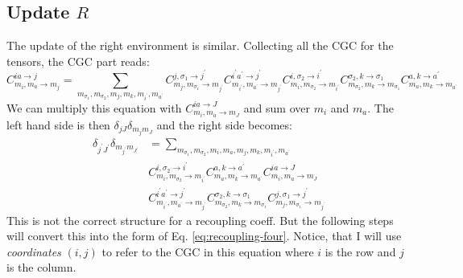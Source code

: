 \documentclass[a4paper,10pt,parskip=full]{scrartcl}
\begin{document}
\subsection{Update $R$}
The update of the right environment is similar.
Collecting all the CGC for the tensors, the CGC part reads:
\begin{equation}
  C^{i a\rightarrow j}_{m_{i},m_{a} \rightarrow m_{j}} =
  \sum_{m_{\sigma_1},m_{\sigma_2},m_j,m_k,m_{i^\prime},m_{a^\prime}}
  C^{ j,\sigma_1\rightarrow j^\prime}_{ m_j,m_{\sigma_1}\rightarrow m_{j^\prime}}
  C^{i^\prime a^\prime\rightarrow j^\prime}_{m_{i^\prime},m_{a^\prime} \rightarrow m_{j^\prime}}
  C^{i,\sigma_2\rightarrow i^\prime}_{m_i,m_{\sigma_2}\rightarrow m_{i^\prime}}
  C^{\sigma_2,k\rightarrow\sigma_1}_{m_{\sigma_2},m_k\rightarrow m_{\sigma_1}}C^{a,k\rightarrow a^\prime}_{m_a,m_k\rightarrow m_{a^\prime}}
\end{equation}
We can multiply this equation with $C^{i a\rightarrow J}_{m_{i},m_{a} \rightarrow m_{J}}$
and sum over $m_{i}$ and $m_{a}$. The left hand side is then $\delta_{jJ}\delta_{m_{j}m_{J}}$
and the right side becomes:
\begin{equation}
  \begin{split}
  \delta_{j^\prime J^\prime}\delta_{m_{j^\prime} m_{J^\prime}} &=
  \sum_{m_{\sigma_1},m_{\sigma_2},m_i,m_a,m_j,m_k,m_{i^\prime},m_{a^\prime}}\\
  &C^{i,\sigma_2\rightarrow i^\prime}_{m_i,m_{\sigma_2}\rightarrow m_{i^\prime}}
  C^{a,k\rightarrow a^\prime}_{m_a,m_k\rightarrow m_{a^\prime}}
  C^{i a\rightarrow J}_{m_{i},m_{a} \rightarrow m_{J}}\\
  &C^{i^\prime a^\prime\rightarrow j^\prime}_{m_{i^\prime},m_{a^\prime} \rightarrow m_{j^\prime}}
  C^{\sigma_2,k\rightarrow\sigma_1}_{m_{\sigma_2},m_k\rightarrow m_{\sigma_1}}
  C^{ j,\sigma_1\rightarrow j^\prime}_{ m_j,m_{\sigma_1}\rightarrow m_{j^\prime}}
  \end{split}
\end{equation}
This is not the correct structure for a recoupling coeff.
But the following steps will convert this into the form of Eq. \eqref{eq:recoupling-four}.
Notice, that I will use \emph{coordinates} $(i,j)$ to refer to the CGC in this equation
where $i$ is the row and $j$ is the column.
\end{document}
